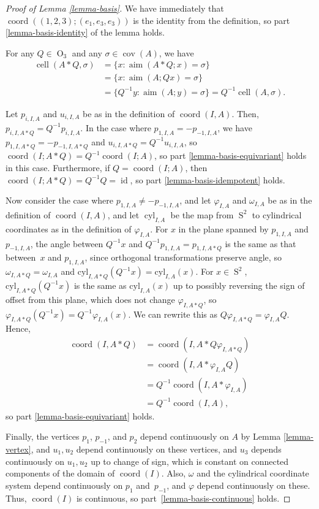 \documentclass[JEP,XML,SOM,Unicode,NoFloatCountersInSection,published]{cedram}
\theoremstyle{remark}
\let\phi\varphi
\DeclareMathOperator{\orth}{O}
\DeclareMathOperator{\sphere}{S}
\DeclareMathOperator{\cell}{cell}
\DeclareMathOperator{\aim}{aim}
\DeclareMathOperator{\coord}{coord}
\DeclareMathOperator{\id}{id}
\DeclareMathOperator{\cov}{cov}
\DeclareMathOperator{\cyl}{cyl}
\begin{document}
\begin{proof}[Proof of Lemma \ref{lemma-basis}]
We have immediately that $\coord((1,2,3);(e_1,e_3,e_3))$ is the identity from the definition, so part \eqref{lemma-basis-identity} of the lemma holds.

For any $Q \in \orth_3$ and any $\sigma \in \cov(A)$, we have
\begin{align*}
\cell(A*Q, \sigma) &= \{x : \aim(A*Q;x) = \sigma\} \\
&= \{x : \aim(A;Qx) = \sigma\} \\
&= \{Q^{-1}y : \aim(A;y) = \sigma\}
= Q^{-1}\cell(A,\sigma).
\end{align*}

Let $p_{i,I,A}$ and $u_{i,I,A}$ be as in the definition of $\coord(I,A)$.
Then, $p_{i,I,A*Q} = Q^{-1}p_{i,I,A}$.
In the case where $p_{1,I,A} = -p_{-1,I,A}$, we have $p_{1,I,A*Q} = -p_{-1,I,A*Q}$ and $u_{i,I,A*Q} = Q^{-1} u_{i,I,A}$, so $\coord(I;A*Q) = Q^{-1}\coord(I;A)$, so part \eqref{lemma-basis-equivariant} holds in this case.
Furthermore, if $Q = \coord(I;A)$, then $\coord(I;A*Q) =Q^{-1}Q=\id$, so part \eqref{lemma-basis-idempotent} holds.

Now consider the case where $p_{1,I,A} \neq -p_{-1,I,A}$, and let $\phi_{I,A}$ and $\omega_{I,A}$
be as in the definition of $\coord(I,A)$,
and let $\cyl_{I,A}$ be the map from $\sphere^2$ to cylindrical coordinates as in the definition of $\phi_{I,A}$.
For $x$ in the plane spanned by $p_{1,I,A}$ and $p_{-1,I,A}$,
the angle between $Q^{-1}x$ and $Q^{-1}p_{1,I,A}= p_{1,I,A*Q}$ is the same as that between~$x$ and $p_{1,I,A}$, since orthogonal transformations preserve angle,
so $\omega_{I,A*Q} = \omega_{I,A}$ and $\mathrm{cyl}_{I,A*Q}(Q^{-1}x) = \mathrm{cyl}_{I,A}(x)$.
For $x \in \sphere^2$, $\mathrm{cyl}_{I,A*Q}(Q^{-1}x)$ is the same as $\mathrm{cyl}_{I,A}(x)$ up to possibly reversing the sign of offset from this plane, which does not change $\phi_{I,A*Q}$, so $\phi_{I,A*Q}(Q^{-1}x) = Q^{-1}\phi_{I,A}(x)$. We can rewrite this as $Q\phi_{I,A*Q} = \phi_{I,A}Q$.
Hence,
\begin{align*}
\coord(I,A*Q) &= \coord(I,A*Q \phi_{I,A*Q}) \\
& = \coord(I,A*\phi_{I,A}Q) \\
& = Q^{-1} \coord(I,A*\phi_{I,A}) \\
& = Q^{-1} \coord(I,A),
\end{align*}
so part \eqref{lemma-basis-equivariant} holds.

Finally, the vertices $p_{1}$, $p_{-1}$, and $p_{2}$ depend continuously on $A$ by Lemma \ref{lemma-vertex}, and $u_1,u_2$ depend continuously on these vertices, and $u_3$ depends continuously on $u_1,u_2$ up to change of sign, which is constant on connected components of the domain of $\coord(I)$.
Also, $\omega$ and the cylindrical coordinate system depend continuously on $p_{1}$ and~$p_{-1}$, and $\phi$ depend continuously on these.
Thus, $\coord(I)$ is continuous, so part~\eqref{lemma-basis-continuous} holds.
\end{proof}
\end{document}
